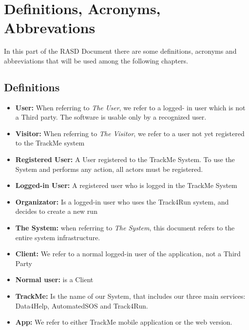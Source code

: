 \section{Definitions, Acronyms, Abbrevations}
In this part of the RASD Document there are some definitions, acronyms and abbreviations that will be used among the following chapters.
\subsection{Definitions}
\begin{itemize}
\item \textbf{User:} When referring to \emph{The User}, we refer to a logged- in user which is not a Third party. The software is usable only by a recognized user. 

\item \textbf{Visitor:} When referring to \emph{The Visitor}, we refer to a user not yet registered to the TrackMe system

\item \textbf{Registered User:} A User registered to the TrackMe System. To use the System and performs any action, all actors must be registered. 

\item\textbf{Logged-in User:} A registered user who is logged in the TrackMe System

\item\textbf{Organizator:} Is a logged-in  user who uses the Track4Run system, and decides to create a new run
\item \textbf{The System:} when referring to \emph{The System}, this document refers to the entire system infrastructure.

\item \textbf{Client:} We refer to a normal logged-in user of the application, not a Third Party
\item\textbf{Normal user: } is a Client

\item\textbf{TrackMe:}
Is the name of our System, that  includes our three main services: Data4Help, AutomatedSOS and Track4Run.
\item\textbf{App:} We refer to either TrackMe mobile application or the web version.


\end{itemize}
